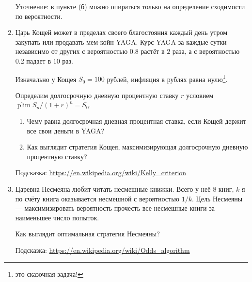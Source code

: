 \documentclass[12pt]{article}
\DeclareMathOperator{\plim}{plim}
\begin{document}
\begin{enumerate}
    Уточнение: в пункте (б) можно опираться только на определение сходимости по вероятности. 

    \item Царь Кощей может в пределах своего благостояния каждый день утром закупать или продавать мем-койн YAGA. 
    Курс YAGA за каждые сутки независимо от других с вероятностью $0.8$ растёт в $2$ раза, а с вероятностью $0.2$ падает в $10$ раз. 
    
    Изначально у Кощея $S_0 = 100$ рублей, инфляция в рублях равна нулю\footnote{это сказочная задача!}.

    Определим долгосрочную дневную процентную ставку $r$ условием $\plim S_n / (1 + r)^n = S_0$.

    \begin{enumerate}
        \item Чему равна долгосрочная дневная процентная ставка, если Кощей держит все свои деньги в YAGA?
        \item Как выглядит стратегия Кощея, максимизирующая долгосрочную дневную процентную ставку?
    \end{enumerate}


    Подсказка: \url{https://en.wikipedia.org/wiki/Kelly_criterion}

    \item Царевна Несмеяна любит читать несмешные книжки. 
    Всего у неё 8 книг, $k$-я по счёту книга оказывается несмешной с вероятностью $1/k$.
    Цель Несмеяны — максимизировать вероятность прочесть все несмешные книги за наименьшее число попыток. 

    Как выглядит оптимальная стратегия Несмеяны?

    Подсказка: \url{https://en.wikipedia.org/wiki/Odds_algorithm}

\end{enumerate}
\end{document}

